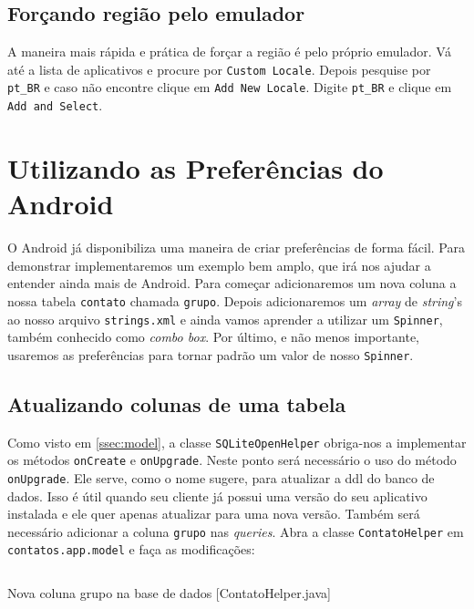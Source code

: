 \subsection{Forçando região pelo emulador}

A maneira mais rápida e prática de forçar a região é pelo próprio
emulador. Vá até a lista de aplicativos e procure por
\texttt{Custom Locale}. Depois pesquise por \texttt{pt\_BR} e caso não
encontre clique em \texttt{Add New Locale}. Digite \texttt{pt\_BR} e
clique em \texttt{Add and Select}.

\section{Utilizando as Preferências do Android}

O Android já disponibiliza uma maneira de criar preferências de forma
fácil. Para demonstrar implementaremos um exemplo bem amplo, que irá nos
ajudar a entender ainda mais de Android. Para começar adicionaremos um
nova coluna a nossa tabela \texttt{contato} chamada \texttt{grupo}.
Depois adicionaremos um \emph{array} de \emph{string}'s ao nosso arquivo
\texttt{strings.xml} e ainda vamos aprender a utilizar um
\texttt{Spinner}, também conhecido como \emph{combo box}. Por último, e
não menos importante, usaremos as preferências para tornar padrão um
valor de nosso \texttt{Spinner}.

\subsection{Atualizando colunas de uma tabela \label{sssec:update-ddl}}

Como visto em \ref{ssec:model}, a classe \texttt{SQLiteOpenHelper}
obriga-nos a implementar os métodos \texttt{onCreate} e
\texttt{onUpgrade}. Neste ponto será necessário o uso do método
\texttt{onUpgrade}. Ele serve, como o nome sugere, para atualizar a
\gls{ddl} do banco de dados. Isso é útil quando seu cliente já possui
uma versão do seu aplicativo instalada e ele quer apenas atualizar para
uma nova versão. Também será necessário adicionar a coluna
\texttt{grupo} nas \emph{queries}. Abra a classe \texttt{ContatoHelper}
em \texttt{contatos.app.model} e faça as modificações:

\begin{listing}[H]
  \inputminted[linenos=true,frame=bottomline,tabsize=3]{ java }{ source/ContatoHelper-6.java }
  \caption{Nova coluna grupo na base de dados [ContatoHelper.java]}
\end{listing}

